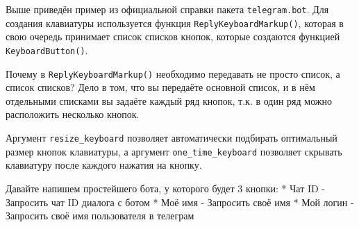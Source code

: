 \documentclass[
]{book}
\newenvironment{Shaded}{\begin{snugshade}}{\end{snugshade}}
\newcommand{\AttributeTok}[1]{\textcolor[rgb]{0.13,0.29,0.53}{#1}}
\newcommand{\CommentTok}[1]{\textcolor[rgb]{0.56,0.35,0.01}{\textit{#1}}}
\newcommand{\ConstantTok}[1]{\textcolor[rgb]{0.56,0.35,0.01}{#1}}
\newcommand{\FunctionTok}[1]{\textcolor[rgb]{0.13,0.29,0.53}{\textbf{#1}}}
\newcommand{\NormalTok}[1]{#1}
\newcommand{\OtherTok}[1]{\textcolor[rgb]{0.56,0.35,0.01}{#1}}
\newcommand{\SpecialCharTok}[1]{\textcolor[rgb]{0.81,0.36,0.00}{\textbf{#1}}}
\newcommand{\StringTok}[1]{\textcolor[rgb]{0.31,0.60,0.02}{#1}}
\begin{document}
\begin{Shaded}
\end{Shaded}

Выше приведён пример из официальной справки пакета \texttt{telegram.bot}. Для создания клавиатуры используется функция \texttt{ReplyKeyboardMarkup()}, которая в свою очередь принимает список списков кнопок, которые создаются функцией \texttt{KeyboardButton()}.

Почему в \texttt{ReplyKeyboardMarkup()} необходимо передавать не просто список, а список списков? Дело в том, что вы передаёте основной список, и в нём отдельными списками вы задаёте каждый ряд кнопок, т.к. в один ряд можно расположить несколько кнопок.

Аргумент \texttt{resize\_keyboard} позволяет автоматически подбирать оптимальный размер кнопок клавиатуры, а аргумент \texttt{one\_time\_keyboard} позволяет скрывать клавиатуру после каждого нажатия на кнопку.

Давайте напишем простейшего бота, у которого будет 3 кнопки:
* Чат ID - Запросить чат ID диалога с ботом
* Моё имя - Запросить своё имя
* Мой логин - Запросить своё имя пользователя в телеграм
\end{document}
